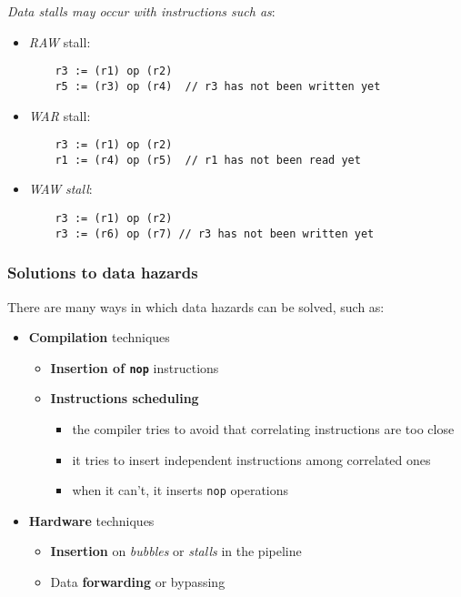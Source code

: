 \documentclass[english]{article}
\begin{document}
\bigskip
\textit{Data stalls may occur with instructions such as}:
\begin{itemize}
  \item \textit{RAW} stall:
        \begin{verbatim}
    r3 := (r1) op (r2)
    r5 := (r3) op (r4)  // r3 has not been written yet\end{verbatim}

  \item \textit{WAR} stall:
        \begin{verbatim}
    r3 := (r1) op (r2)
    r1 := (r4) op (r5)  // r1 has not been read yet \end{verbatim}
  \item \textit{WAW}  \textit{stall}:
        \begin{verbatim}
    r3 := (r1) op (r2)
    r3 := (r6) op (r7) // r3 has not been written yet \end{verbatim}
\end{itemize}

\subsubsection{Solutions to data hazards}

There are many ways in which data hazards can be solved, such as:

\begin{itemize}
  \item \textbf{Compilation} techniques
        \begin{itemize}
          \item \textbf{Insertion of \texttt{nop}} instructions
          \item \textbf{Instructions scheduling}
                \begin{itemize}
                  \item the compiler tries to avoid that correlating instructions are too close
                  \item it tries to insert independent instructions among correlated ones
                  \item when it can't, it inserts \texttt{nop} operations
                \end{itemize}
        \end{itemize}
  \item \textbf{Hardware} techniques
        \begin{itemize}
          \item \textbf{Insertion} on \textit{bubbles} or \textit{stalls} in the pipeline
          \item Data \textbf{forwarding} or bypassing
        \end{itemize}
\end{itemize}
\end{document}
